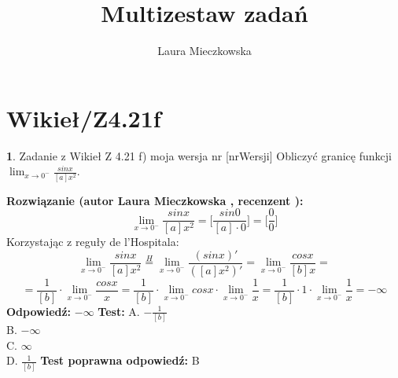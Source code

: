 \documentclass[12pt, a4paper]{article}
\title{Multizestaw zadań}
\author{Laura Mieczkowska}
\date{}
\theoremstyle{definition} %
\newtheorem{zad}{}
\newcommand{\kategoria}[1]{\section{#1}} %
\newcommand{\zadStart}[1]{\begin{zad}#1\newline} %
\newcommand{\zadStop}{\end{zad}}   %
\newcommand{\rozwStart}[2]{\noindent \textbf{Rozwiązanie (autor #1 , recenzent #2): }\newline} %
\newcommand{\odpStart}{\noindent \textbf{Odpowiedź:}\newline}    %
\newcommand{\odpStop}{\newline}                                             %
\newcommand{\testStart}{\noindent \textbf{Test:}\newline} %
\newcommand{\testStop}{\newline} %
\newcommand{\kluczStart}{\noindent \textbf{Test poprawna odpowiedź:}\newline} %
\newcommand{\kluczStop}{\newline} %
\begin{document}
\maketitle


\kategoria{Wikieł/Z4.21f}
\zadStart{Zadanie z Wikieł Z 4.21 f) moja wersja nr [nrWersji]}
Obliczyć granicę funkcji $\lim_{x \to 0^{-}}\frac{sinx}{[a]x^2}$.
\zadStop
\rozwStart{Laura Mieczkowska}{}
$$\lim_{x \to 0^{-}}\frac{sinx}{[a]x^2}=\bigg[\frac{sin0}{[a]\cdot 0}\bigg]=\bigg[\frac{0}{0}\bigg]$$
Korzystając z reguły de l'Hospitala:
$$\lim_{x \to 0^{-}}\frac{sinx}{[a]x^2}\stackrel{H}{=}
\lim_{x \to 0^{-}}\frac{(sinx)'}{([a]x^2)'}=\lim_{x \to 0^{-}}\frac{cosx}{[b]x}=$$
$$=\frac{1}{[b]}\cdot\lim_{x \to 0^{-}}\frac{cosx}{x}=\frac{1}{[b]}\cdot\lim_{x \to 0^{-}}cosx\cdot
\lim_{x \to 0^{-}}\frac{1}{x}=\frac{1}{[b]}\cdot 1\cdot\lim_{x \to 0^{-}}\frac{1}{x}=-\infty$$
\odpStart
$-\infty$
\odpStop
\testStart
A. $-\frac{1}{[b]}$ \\
B. $-\infty$ \\
C. $\infty$ \\
D. $\frac{1}{[b]}$ 
\testStop
\kluczStart
B
\kluczStop
\end{document}
